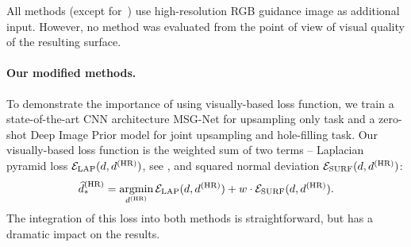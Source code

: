 All methods (except for~\cite{xie2016edge}) use high-resolution RGB guidance image as additional input. However, no method was evaluated from the point of view of visual quality of the resulting surface. 

\paragraph{Our modified methods.}
To demonstrate the importance of using visually-based loss function, we train a  state-of-the-art CNN architecture MSG-Net \cite{hui2016depth} for upsampling only task and a zero-shot Deep Image Prior model \cite{Ulyanov_2018_CVPR} for joint upsampling and hole-filling task. Our visually-based loss function is the weighted sum of two terms -- Laplacian pyramid loss $\mathcal{E}_{\mathrm{LAP}}(d, d^{\mathrm{(HR)}})$, see \cite{pmlr-v80-bojanowski18a}, and squared normal deviation $\mathcal{E}_{\mathrm{SURF}}(d, d^{\mathrm{(HR)}})$:
\begin{multline}
\label{eq:our_visual_metric}
\widehat{d}^{\mathrm{(HR)}}_* = 
    \operatorname*{\mathrm{argmin}}\limits_{ d^{\mathrm{(HR)}}} \mathcal{E}_{\mathrm{LAP}}(d, d^{\mathrm{(HR)}}) +
    w\cdot\mathcal{E}_{\mathrm{SURF}}(d, d^{\mathrm{(HR)}}).
\end{multline}
The integration of this loss into both methods is straightforward, but has a dramatic impact on the results. 

